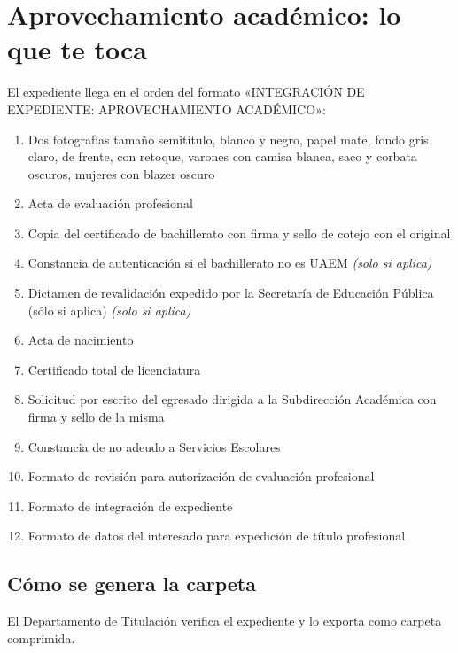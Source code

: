 \section{Aprovechamiento académico: lo que te toca}
El expediente llega en el orden del formato «INTEGRACIÓN DE EXPEDIENTE: APROVECHAMIENTO ACADÉMICO»:
\begin{enumerate}
  \item Dos fotografías tamaño semitítulo, blanco y negro, papel mate, fondo gris claro, de frente, con retoque, varones con camisa blanca, saco y corbata oscuros, mujeres con blazer oscuro
  \item Acta de evaluación profesional
  \item Copia del certificado de bachillerato con firma y sello de cotejo con el original
  \item Constancia de autenticación si el bachillerato no es UAEM \emph{(solo si aplica)}
  \item Dictamen de revalidación expedido por la Secretaría de Educación Pública (sólo si aplica) \emph{(solo si aplica)}
  \item Acta de nacimiento
  \item Certificado total de licenciatura
  \item Solicitud por escrito del egresado dirigida a la Subdirección Académica con firma y sello de la misma
  \item Constancia de no adeudo a Servicios Escolares
  \item Formato de revisión para autorización de evaluación profesional
  \item Formato de integración de expediente
  \item Formato de datos del interesado para expedición de título profesional
\end{enumerate}
\subsection{Cómo se genera la carpeta}
El Departamento de Titulación verifica el expediente y lo exporta como carpeta comprimida.
